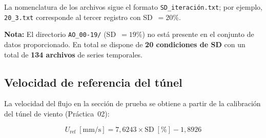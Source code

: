 \documentclass[12pt,a4paper]{article}
\begin{document}
La nomenclatura de los archivos sigue el formato
\texttt{SD\_iteración.txt}; por ejemplo, \texttt{20\_3.txt} corresponde al
tercer registro con SD~$= 20\%$.

\textbf{Nota:} El directorio \texttt{AO\_00-19/} (SD~$= 19\%$) no está
presente en el conjunto de datos proporcionado.  En total se dispone de
\textbf{20 condiciones de SD} con un total de \textbf{134 archivos} de
series temporales.

\subsection{Velocidad de referencia del túnel}

La velocidad del flujo en la sección de prueba se obtiene a partir de la
calibración del túnel de viento (Práctica~02):

\begin{equation}
	\boxed{U_\mathrm{ref}\;[\text{mm/s}]
	= 7{,}6243 \times \mathrm{SD}\;[\%] - 1{,}8926}
	\label{eq:U_ref_tunel}
\end{equation}
\end{document}
